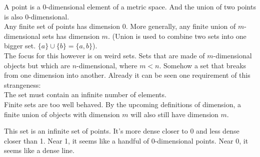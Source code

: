 \documentclass[11pt]{ekblite}
\begin{document}
\begin{example}
	A point is a 0-dimensional element of a metric space. And the union of two points is also 0-dimensional.
	\\[0.2in]Any finite set of points has dimension 0. More generally, any finite union of $m$-dimensional sets has dimension $m$. (Union is used to combine two sets into one bigger set. $\{a\} \cup \{b\} = \{a,b\}$).
	\\[0.2in]The focus for this however is on weird sets. Sets that are made of $m$-dimensional objects but which are $n$-dimensional, where $m < n$. Somehow a set that breaks from one dimension into another. Already it can be seen one requirement of this strangeness:
	\\[0.2in]The set must contain an infinite number of elements.
	\\[0.2in]Finite sets are too well behaved. By the upcoming definitions of dimension, a finite union of objects with dimension $m$ will also still have dimension $m$. 
\end{example}
\begin{example}
	This set is an infinite set of points. It's more dense closer to 0 and less dense closer than 1. Near 1, it seems like a handful of 0-dimensional points. Near 0, it seems like a dense line.
\end{example}
\newpage
\end{document}
